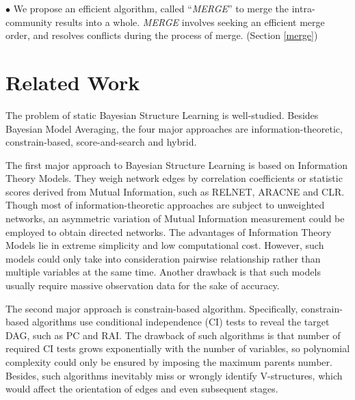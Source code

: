 $\bullet$ We propose an efficient algorithm, called ``\emph{MERGE}'' to merge the intra-community results into a whole. \emph{MERGE} involves seeking an efficient merge order, and resolves conflicts during the process of merge. (Section \ref{merge})


\section{Related Work}
\label{relate}

The problem of static Bayesian Structure Learning is well-studied. Besides Bayesian Model Averaging, the four major approaches are information-theoretic, constrain-based, score-and-search and hybrid.

The first major approach to Bayesian Structure Learning is based on Information Theory Models. They weigh network edges by correlation coefficients or statistic scores derived from Mutual Information\cite{geneRegulatoryNetReview}, such as RELNET\cite{relnet}, ARACNE\cite{DBLP:journals/bmcbi/MargolinNBWSFC06} and CLR\cite{clr}. Though most of information-theoretic approaches are subject to unweighted networks, an asymmetric variation of Mutual Information measurement could be employed to obtain directed networks\cite{Rao_usingdirected}. The advantages of Information Theory Models lie in extreme simplicity and low computational cost. However, such models could only take into consideration pairwise relationship rather than multiple variables at the same time. Another drawback is that such models usually require massive observation data for the sake of accuracy.

The second major approach is constrain-based algorithm. Specifically, constrain-based algorithms use conditional independence (CI) tests to reveal the target DAG, such as PC\cite{Spirtes2000} and RAI\cite{rai}. The drawback of such algorithms is that number of required CI tests grows exponentially with the number of variables, so polynomial complexity could only be ensured by imposing the maximum parents number. Besides, such algorithms inevitably miss or wrongly identify V-structures, which would affect the orientation of edges and even subsequent stages.

